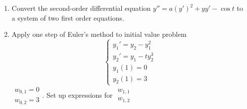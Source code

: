 \documentclass[12pt,letterpaper,noanswers]{exam}
\begin{document}
\begin{enumerate}[resume]
\item Convert the second-order differential equation $y'' = a(y')^2 +yy' - \cos t$ to a system of two first order equations.
\item Apply one step of Euler's method to initial value problem \[\left\{\begin{array}{l}
y_1' = y_2 - y_1^2 \\
y_2' = y_1 -ty_2^3 \\
y_1(1) = 0 \\
y_2(1) = 3 \end{array}\right.\]
$\begin{array}{l}
w_{0,1} = 0\\
w_{0,2} = 3
\end{array}$. Set up expressions for $\begin{array}{l}
w_{1,1}\\
w_{1,2}
\end{array}$
\vspace{1in}
\end{enumerate}




    
\end{document}
